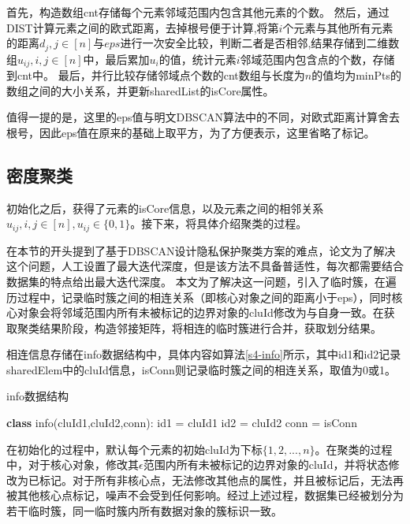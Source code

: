 首先，构造数组cnt存储每个元素邻域范围内包含其他元素的个数。
然后，通过DIST计算元素之间的欧式距离，去掉根号便于计算,将第$ i $个元素与其他所有元素的距离$ d_j,j\in[n] $与$ eps $进行一次安全比较，判断二者是否相邻,结果存储到二维数组$ u_{ij},i,j\in[n] $中，最后累加$ u_i$的值，统计元素$ i $邻域范围内包含点的个数，存储到cnt中。
最后，并行比较存储邻域点个数的cnt数组与长度为$ n $的值均为minPts的数组之间的大小关系，并更新sharedList的isCore属性。

值得一提的是，这里的eps值与明文DBSCAN算法中的不同，对欧式距离计算舍去根号，因此eps值在原来的基础上取平方，为了方便表示，这里省略了标记。


\subsection{密度聚类}
\label{t1-julei}
初始化之后，获得了元素的isCore信息，以及元素之间的相邻关系$ u_{ij},i,j\in[n],u_{ij}\in\{0,1\} $。接下来，将具体介绍聚类的过程。

在本节的开头提到了基于DBSCAN设计隐私保护聚类方案的难点，论文\cite{bozdemir2021privacy}为了解决这个问题，人工设置了最大迭代深度，但是该方法不具备普适性，每次都需要结合数据集的特点给出最大迭代深度。
本文为了解决这一问题，引入了临时簇，在遍历过程中，记录临时簇之间的相连关系（即核心对象之间的距离小于eps），同时核心对象会将邻域范围内所有未被标记的边界对象的cluId修改为与自身一致。在获取聚类结果阶段，构造邻接矩阵，将相连的临时簇进行合并，获取划分结果。

相连信息存储在info数据结构中，具体内容如算法\ref{s4-info}所示，其中id1和id2记录sharedElem中的cluId信息，isConn则记录临时簇之间的相连关系，取值为0或1。
\begin{algorithm}
	\caption{info数据结构}
	\label{s4-info}
	\begin{algorithmic}[1]
		\STATE \textbf{class} info(cluId1,cluId2,conn):
		\STATE \hspace{\algorithmicindent} id1 = cluId1
		\STATE \hspace{\algorithmicindent} id2 = cluId2
		\STATE \hspace{\algorithmicindent} conn = isConn
	\end{algorithmic}
\end{algorithm}

在初始化的过程中，默认每个元素的初始cluId为下标$ \{1,2,...,n\} $。在聚类的过程中，对于核心对象，修改其$ \epsilon $范围内所有未被标记的边界对象的cluId，并将状态修改为已标记。对于所有非核心点，无法修改其他点的属性，并且被标记后，无法再被其他核心点标记，噪声不会受到任何影响。经过上述过程，数据集已经被划分为若干临时簇，同一临时簇内所有数据对象的簇标识一致。

